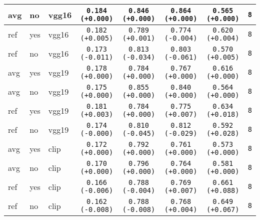 \begin{tabular}{|l|l|l|c|c|c|c|c|}
\rowcolor{verylightgray}avg & no & vgg16 & \texttt{0.184 {\color{black}(+0.000)}} & \texttt{0.846 {\color{black}(+0.000)}} & \texttt{0.864 {\color{black}(+0.000)}} & \texttt{0.565 {\color{black}(+0.000)}} & \texttt{8} \\
\hline
ref & yes & vgg16 & \texttt{0.182 {\color{green}(+0.005)}} & \texttt{0.789 {\color{red}(+0.001)}} & \texttt{0.774 {\color{green}(-0.004)}} & \texttt{0.620 {\color{green}(+0.004)}} & \texttt{8} \\
ref & no & vgg16 & \texttt{0.173 {\color{red}(-0.011)}} & \texttt{0.813 {\color{green}(-0.034)}} & \texttt{0.803 {\color{green}(-0.061)}} & \texttt{0.570 {\color{green}(+0.005)}} & \texttt{8} \\
\hline
\rowcolor{verylightgray}avg & yes & vgg19 & \texttt{0.178 {\color{black}(+0.000)}} & \texttt{0.784 {\color{black}(+0.000)}} & \texttt{0.767 {\color{black}(+0.000)}} & \texttt{0.616 {\color{black}(+0.000)}} & \texttt{8} \\
\rowcolor{verylightgray}avg & no & vgg19 & \texttt{0.175 {\color{black}(+0.000)}} & \texttt{0.855 {\color{black}(+0.000)}} & \texttt{0.840 {\color{black}(+0.000)}} & \texttt{0.564 {\color{black}(+0.000)}} & \texttt{8} \\
\hline
ref & yes & vgg19 & \texttt{0.181 {\color{green}(+0.003)}} & \texttt{0.784 {\color{black}(+0.000)}} & \texttt{0.775 {\color{red}(+0.007)}} & \texttt{0.634 {\color{green}(+0.018)}} & \texttt{8} \\
ref & no & vgg19 & \texttt{0.174 {\color{black}(-0.000)}} & \texttt{0.810 {\color{green}(-0.045)}} & \texttt{0.812 {\color{green}(-0.029)}} & \texttt{0.592 {\color{green}(+0.028)}} & \texttt{8} \\
\hline
\rowcolor{verylightgray}avg & yes & clip & \texttt{0.172 {\color{black}(+0.000)}} & \texttt{0.792 {\color{black}(+0.000)}} & \texttt{0.761 {\color{black}(+0.000)}} & \texttt{0.573 {\color{black}(+0.000)}} & \texttt{8} \\
\rowcolor{verylightgray}avg & no & clip & \texttt{0.170 {\color{black}(+0.000)}} & \texttt{0.796 {\color{black}(+0.000)}} & \texttt{0.764 {\color{black}(+0.000)}} & \texttt{0.581 {\color{black}(+0.000)}} & \texttt{8} \\
\hline
ref & yes & clip & \texttt{0.166 {\color{red}(-0.006)}} & \texttt{0.788 {\color{green}(-0.004)}} & \texttt{0.769 {\color{red}(+0.007)}} & \texttt{0.661 {\color{green}(+0.088)}} & \texttt{8} \\
ref & no & clip & \texttt{0.162 {\color{red}(-0.008)}} & \texttt{0.788 {\color{green}(-0.008)}} & \texttt{0.768 {\color{red}(+0.004)}} & \texttt{0.649 {\color{green}(+0.067)}} & \texttt{8} \\
\hline
\end{tabular}
